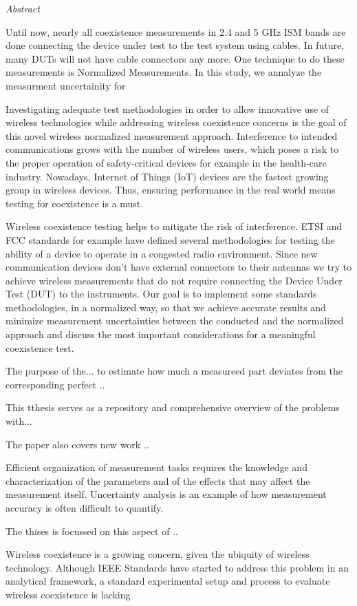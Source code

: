 

\newpage
\thispagestyle{empty}
\begin{center}
\Huge\emph{Abstract}
\end{center}
\medskip
\noindent
Until now, nearly all coexistence measurements in 2.4 and 5 GHz ISM bands are done connecting the device under test to the test system using cables. In future, many DUTs will
not have cable connectors any more. One technique to do these measurements is Normalized Measurements. In this study, we annalyze the measurment uncertainity for 


Investigating adequate test methodologies in order to allow innovative use of wireless technologies while addressing wireless coexistence concerns is the goal of this novel wireless normalized measurement approach. Interference to intended communications grows with the number of wireless users, which poses a risk to the proper operation of safety-critical devices for example in the health-care industry. Nowadays, Internet of Things (IoT) devices are the fastest growing group in wireless devices. Thus, ensuring performance in the real world means testing for coexistence is a must.

Wireless coexistence testing helps to mitigate the risk of interference. ETSI and FCC standards for example have defined several methodologies for testing the ability of a device to operate in a congested radio environment. Since new communication devices don’t have external connectors to their antennas we try to achieve wireless measurements that do not require connecting the Device Under Test (DUT) to the instruments. Our goal is to implement some standards methodologies, in a normalized way, so that we achieve accurate results and minimize measurement uncertainties between the conducted and the normalized approach and discuss the most important considerations for a meaningful coexistence test.

The purpose of the... to estimate how much a measureed part deviates from the corresponding perfect ..

This tthesis serves as a repository and comprehensive overview of the problems with... 

The paper also covers new work ..

Efficient organization of measurement tasks requires the knowledge and characterization of the
parameters and of the effects that may affect the measurement itself. Uncertainty analysis is
an example of how measurement accuracy is often difficult to quantify.

The thises is focussed on this aspect of ..

Wireless coexistence is a growing concern, given the ubiquity of wireless technology. Although IEEE Standards have started to address this problem in an analytical framework, a standard experimental setup and process to evaluate wireless coexistence is lacking

